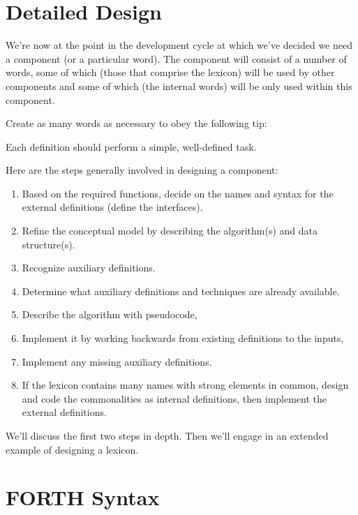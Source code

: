 \blackline{1ex}

\section{Detailed Design}

We're now at the point in the development cycle at which we've decided
we need a component (or a particular word). The component will consist
of a number of words, some of which (those that comprise the lexicon) will
be used by other components and some of which (the internal words) will
be only used within this component.

Create as many words as necessary to obey the following tip:
\begin{tip}
Each definition should perform a simple, well-defined task.
\end{tip}
Here are the steps generally involved in designing a component:
\begin{enumerate}
\item Based on the required functions, decide on the names and syntax for the
   external definitions (define the interfaces).
\item Refine the conceptual model by describing the algorithm(s) and data
   structure(s).
\item Recognize auxiliary definitions.
\item Determine what auxiliary definitions and techniques are already available.
\item Describe the algorithm with pseudocode,
\item Implement it by working backwards from existing definitions to the inputs,
\item Implement any missing auxiliary definitions.
\item If the lexicon contains many names with strong elements in common,
   design and code the commonalities as internal definitions, then implement
   the external definitions.
\end{enumerate}
We'll discuss the first two steps in depth. Then we'll engage in an
extended example of designing a lexicon.

\section{FORTH Syntax}

